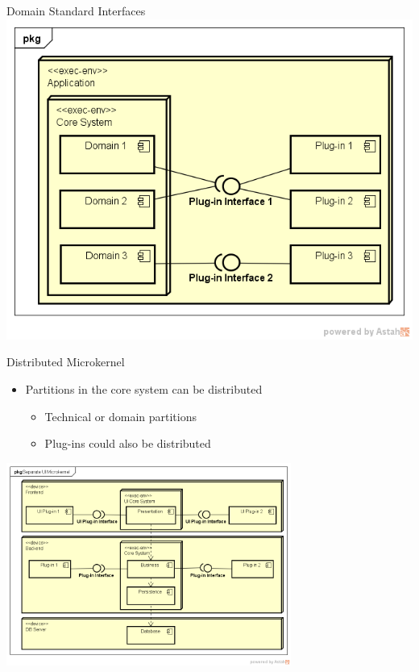 \documentclass{slide}
\begin{document}
\begin{frame}{Domain Standard Interfaces}
    \vspace{3mm}
    \centering
    \includegraphics[trim=38 42 23 42,clip,width=1.25\textheight]{../../notes/microkernel/diagrams/domain-microkernel.png}
\end{frame}

\begin{frame}{Distributed Microkernel}
    \begin{itemize}
        \LARGE\item Partitions in the core system can be distributed
        \begin{itemize}
            \Large\item Technical or domain partitions
            \Large\item Plug-ins could also be distributed
        \end{itemize}
    \end{itemize}
    \vspace{3mm}
    \centering
    \includegraphics[trim=39 138 19 43,clip,width=0.7\textwidth]{../../notes/microkernel/diagrams/separate-ui-microkernel.png}
\end{frame}
\end{document}
